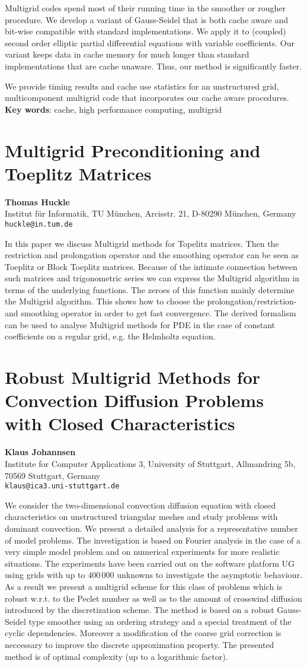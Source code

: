 \documentclass[11pt]{article}
\newcommand{\nextab}[4]{
	\section{#2}
	{\bf #1} \\ \nopagebreak
	{#3} \\ \nopagebreak
	{\tt #4} \nopagebreak
	}
\begin{document}
Multigrid codes spend most of their running time in the smoother or rougher
procedure.  We develop a variant of Gauss-Seidel that is both cache aware and
bit-wise compatible with standard implementations.  We apply it to (coupled)
second order elliptic partial differential equations with variable
coefficients.  Our variant keeps data in cache memory for much longer than
standard implementations that are cache unaware.  Thus, our method is
significantly faster.

We provide timing results and cache use statistics for an unstructured grid,
multicomponent multigrid code that incorporates our cache aware procedures.
{\bf Key words}: cache, high performance computing, multigrid


\nextab{Thomas Huckle}
	{Multigrid Preconditioning and Toeplitz Matrices}
	{Institut f\"ur Informatik, TU M\"unchen,
		Arcisstr. 21, D-80290 M\"unchen, Germany}
	{huckle@in.tum.de}

In this paper we discuss Multigrid methods for Topelitz matrices. Then
the restriction and prolongation operator and the smoothing operator
can be seen as Toeplitz or Block Toeplitz matrices. Because of the intimate
connection between such matrices and
trigonometric series we can express the Multigrid algorithm  in terms of
the underlying functions. The zeroes of this function mainly determine
the Multigrid algorithm. This shows how to choose the
prolongation/restriction- and smoothing operator in order to get fast
convergence.
The derived formalism can be used to analyse Multigrid methods
for PDE in the case of constant coefficients on a regular grid, e.g.
 the Helmholtz equation.


\nextab{Klaus Johannsen}
	{Robust Multigrid Methods for Convection Diffusion Problems
		with Closed Characteristics}
	{Institute for Computer Applications 3, University of Stuttgart,
		Allmandring 5b, 70569 Stuttgart, Germany}
	{klaus@ica3.uni-stuttgart.de}

We consider the two-dimensional convection diffusion equation with
closed characteristics on unstructured triangular meshes
and study problems with dominant convection.
We present a detailed analysis
for a representative number of model problems. The investigation is based on
Fourier analysis in the case of a very simple model problem and on numerical
experiments for more realistic situations.
The experiments have been carried
out on the software platform UG
using grids with up to $400\,000$ unknowns to investigate
the asymptotic behaviour.
As a result we present a multigrid scheme for this class of problems
which is robust w.r.t. to the Peclet number as well as to
the amount of crosswind diffusion introduced by the discretization scheme.
The method is based on a robust Gauss-Seidel type smoother using
an ordering strategy and a special treatment of the cyclic dependencies.
Moreover a modification of the coarse grid correction is neccessary to
improve the discrete approximation property. The presented method is
of optimal complexity (up to a logarithmic factor).
\end{document}
